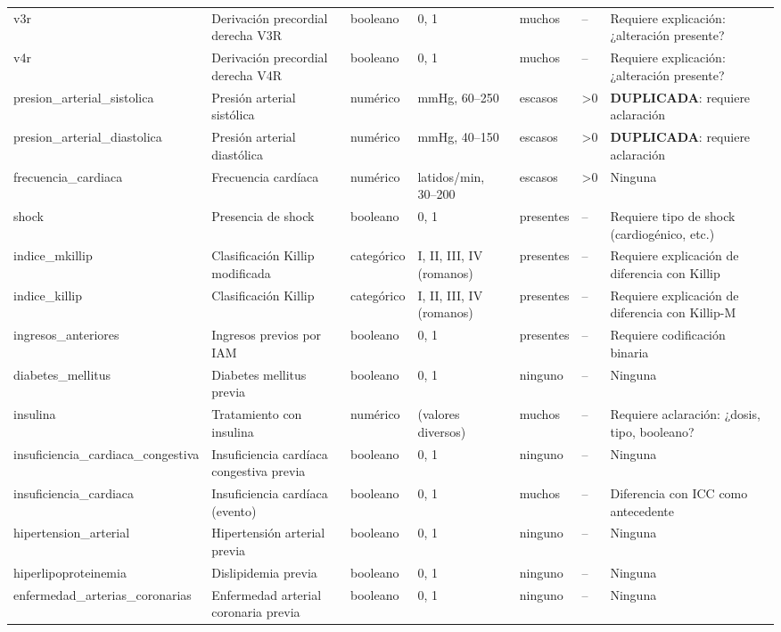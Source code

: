 \documentclass[11pt,a4paper]{article}
\begin{document}
\begin{longtable}{@{}L{0.095\textwidth} L{0.17\textwidth} L{0.07\textwidth} L{0.16\textwidth} L{0.14\textwidth} L{0.13\textwidth} L{0.15\textwidth}@{}}
v3r & Derivación precordial derecha V3R & booleano & 0, 1 & muchos & -- & Requiere explicación: ¿alteración presente? \\
v4r & Derivación precordial derecha V4R & booleano & 0, 1 & muchos & -- & Requiere explicación: ¿alteración presente? \\
presion\_arterial\_sistolica & Presión arterial sistólica & numérico & mmHg, 60--250 & escasos & >0 & \textbf{DUPLICADA}: requiere aclaración \\
presion\_arterial\_diastolica & Presión arterial diastólica & numérico & mmHg, 40--150 & escasos & >0 & \textbf{DUPLICADA}: requiere aclaración \\
frecuencia\_cardiaca & Frecuencia cardíaca & numérico & latidos/min, 30--200 & escasos & >0 & Ninguna \\
shock & Presencia de shock & booleano & 0, 1 & presentes & -- & Requiere tipo de shock (cardiogénico, etc.) \\
indice\_mkillip & Clasificación Killip modificada & categórico & I, II, III, IV (romanos) & presentes & -- & Requiere explicación de diferencia con Killip \\
indice\_killip & Clasificación Killip & categórico & I, II, III, IV (romanos) & presentes & -- & Requiere explicación de diferencia con Killip-M \\
ingresos\_anteriores & Ingresos previos por IAM & booleano & 0, 1 & presentes & -- & Requiere codificación binaria \\
diabetes\_mellitus & Diabetes mellitus previa & booleano & 0, 1 & ninguno & -- & Ninguna \\
insulina & Tratamiento con insulina & numérico & (valores diversos) & muchos & -- & Requiere aclaración: ¿dosis, tipo, booleano? \\
insuficiencia\_cardiaca\_congestiva & Insuficiencia cardíaca congestiva previa & booleano & 0, 1 & ninguno & -- & Ninguna \\
insuficiencia\_cardiaca & Insuficiencia cardíaca (evento) & booleano & 0, 1 & muchos & -- & Diferencia con ICC como antecedente \\
hipertension\_arterial & Hipertensión arterial previa & booleano & 0, 1 & ninguno & -- & Ninguna \\
hiperlipoproteinemia & Dislipidemia previa & booleano & 0, 1 & ninguno & -- & Ninguna \\
enfermedad\_arterias\_coronarias & Enfermedad arterial coronaria previa & booleano & 0, 1 & ninguno & -- & Ninguna \\

\end{longtable}
\end{document}
